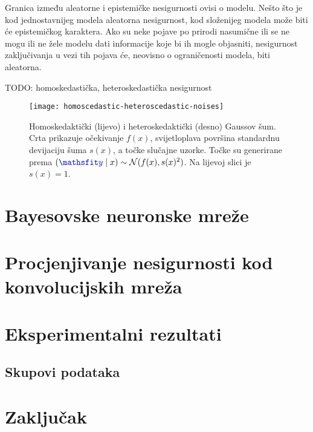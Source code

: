 \documentclass[utf8, diplomski, lmodern]{fer}
\begin{document}
Granica između aleatorne i epistemičke nesigurnosti ovisi o modelu. Nešto što je kod jednostavnijeg modela aleatorna nesigurnost, kod složenijeg modela može biti će epistemičkog karaktera. Ako su neke pojave po prirodi nasumične ili se ne mogu ili ne žele modelu dati informacije koje bi ih mogle objasniti, nesigurnost zaključivanja u vezi tih pojava će, neovisno o ograničenosti modela, biti aleatorna.

TODO: homoskedastička, heteroskedastička nesigurnost

\the{}\font\newline %
\the{}\font\newline %

\the\textwidth

\begin{figure}
	\centering
	\texttt{[image: homoscedastic-heteroscedastic-noises]}
	\caption{Homoskedaktički (lijevo) i heteroskedaktički (desno) Gaussov šum.  Crta prikazuje očekivanje $f(x)$, svijetloplava površina standardnu devijaciju šuma $s(x)$, a točke slučajne uzorke. Točke su generirane prema $(\rvar y\mid x) \sim \mathcal{N}(f(x),s(x)^2)$. Na lijevoj slici je $s(x)=1$.}
	\label{fig:homoscedastic-heteroscedastic-noises}
\end{figure}



\chapter{Bayesovske neuronske mreže}



\chapter{Procjenjivanje nesigurnosti kod konvolucijskih mreža}



\chapter{Eksperimentalni rezultati}


\section{Skupovi podataka}



\chapter{Zaključak}
\end{document}

